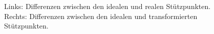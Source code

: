 \begin{figure}[H]
	\caption{Links: Differenzen zwischen den idealen und realen Stützpunkten. \\Rechts: Differenzen zwischen den idealen und transformierten Stützpunkten.}
	\label{fig:diffsResult}
\end{figure}

